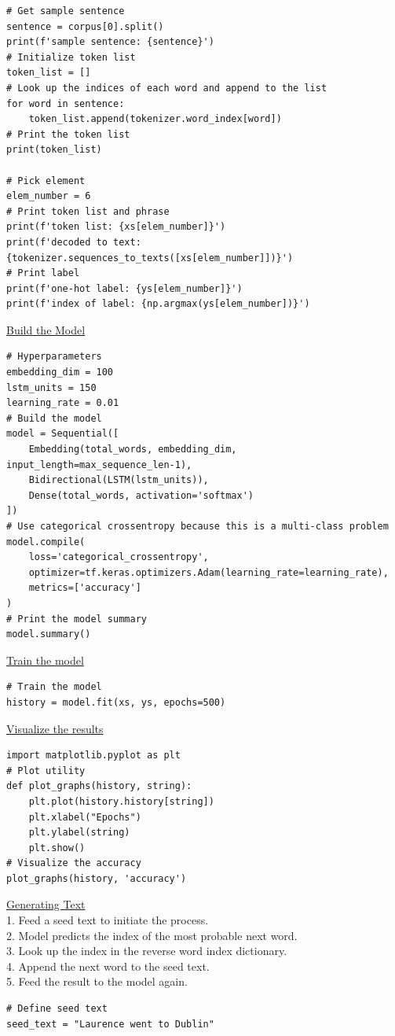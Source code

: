 \documentclass[20pt]{article}
\begin{document}
\begin{itemize}
\begin{verbatim}
# Get sample sentence
sentence = corpus[0].split()
print(f'sample sentence: {sentence}')
# Initialize token list
token_list = []
# Look up the indices of each word and append to the list
for word in sentence: 
	token_list.append(tokenizer.word_index[word])
# Print the token list
print(token_list)

# Pick element
elem_number = 6
# Print token list and phrase
print(f'token list: {xs[elem_number]}')
print(f'decoded to text: {tokenizer.sequences_to_texts([xs[elem_number]])}')
# Print label
print(f'one-hot label: {ys[elem_number]}')
print(f'index of label: {np.argmax(ys[elem_number])}')
		\end{verbatim}
		\underline{Build the Model}\\
		\begin{verbatim}
# Hyperparameters
embedding_dim = 100
lstm_units = 150
learning_rate = 0.01
# Build the model
model = Sequential([
	Embedding(total_words, embedding_dim, input_length=max_sequence_len-1),
	Bidirectional(LSTM(lstm_units)),
	Dense(total_words, activation='softmax')
])
# Use categorical crossentropy because this is a multi-class problem
model.compile(
	loss='categorical_crossentropy', 
	optimizer=tf.keras.optimizers.Adam(learning_rate=learning_rate), 
	metrics=['accuracy']
)
# Print the model summary
model.summary()
		\end{verbatim}
		\underline{Train the model}
		\begin{verbatim}
# Train the model
history = model.fit(xs, ys, epochs=500)
		\end{verbatim}
		\underline{Visualize the results}
		\begin{verbatim}
import matplotlib.pyplot as plt
# Plot utility
def plot_graphs(history, string):
	plt.plot(history.history[string])
	plt.xlabel("Epochs")
	plt.ylabel(string)
	plt.show()
# Visualize the accuracy
plot_graphs(history, 'accuracy')
		\end{verbatim}
		\underline{Generating Text}\\
		1. Feed a seed text to initiate the process.\\
		2. Model predicts the index of the most probable next word.\\
		3. Look up the index in the reverse word index dictionary.\\
		4. Append the next word to the seed text.\\
		5. Feed the result to the model again.
		\begin{verbatim}
# Define seed text
seed_text = "Laurence went to Dublin"

\end{verbatim}
\end{itemize}
\end{document}
